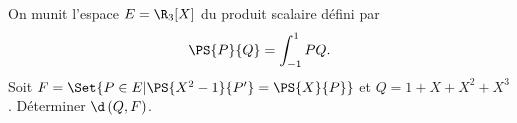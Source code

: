 \begin{enonce}
\begin{exercise}[ID={RMS127 E692},subtitle={Mines-Ponts PSI 2016},tags={}]
  On munit l'espace $E=\R_3[X]$ du produit scalaire défini par
  \begin{equation*}
    \PS{P}{Q} = \int_{-1}^{1} PQ.
  \end{equation*}
  Soit $F=\Set{P\in E | \PS{X^2-1}{P'} = \PS{X}{P}}$ et $Q=1+X+X^2+X^3$.
  Déterminer $\d\left( Q,F \right)$.
\end{exercise}
\begin{solution}
\end{solution}
\end{enonce}
